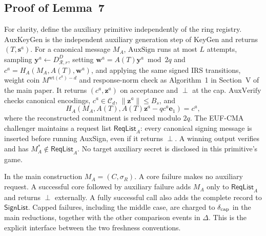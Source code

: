 \documentclass[lettersize,journal]{IEEEtran}
\begin{document}
\subsection{Proof of Lemma~7}
\label{app:proof-auxiliary-authentication}
For clarity, define the auxiliary primitive independently of the ring registry. $\mathrm{AuxKeyGen}$ is the independent auxiliary generation step of KeyGen and returns $(T,\mathbf s^a)$. For a canonical message $M_A$, $\mathrm{AuxSign}$ runs at most $L$ attempts, sampling $\mathbf y^a\leftarrow D_{\mathcal R,r}^D$, setting $\mathbf w^a=A(T)\mathbf y^a\bmod2q$ and $c^a=H_A(M_A,A(T),\mathbf w^a)$, and applying the same signed IRS transitions, weight coin $M^{\mathrm{wt}(c^a)-d}$ and response-norm check as Algorithm~1 in Section~V of the main paper. It returns $(c^a,\mathbf z^a)$ on acceptance and $\perp$ at the cap. $\mathrm{AuxVerify}$ checks canonical encodings, $c^a\in\mathcal C_d$, $\|\mathbf z^a\|\le B_s$, and
\[
H_A(M_A,A(T),A(T)\mathbf z^a-qc^a\mathbf e_1)=c^a,
\]
where the reconstructed commitment is reduced modulo $2q$. The EUF-CMA challenger maintains a request list $\mathsf{ReqList}_A$: every canonical signing message is inserted before running AuxSign, even if it returns $\perp$. A winning output verifies and has $M_A^*\notin\mathsf{ReqList}_A$. No target auxiliary secret is disclosed in this primitive's game.

In the main construction $M_A=(C,\sigma_R)$. A core failure makes no auxiliary request. A successful core followed by auxiliary failure adds $M_A$ only to $\mathsf{ReqList}_A$ and returns $\perp$ externally. A fully successful call also adds the complete record to $\mathsf{SignList}$. Capped failures, including the middle case, are charged to $\delta_{\rm cap}$ in the main reductions, together with the other comparison events in $\Delta$. This is the explicit interface between the two freshness conventions.
\end{document}
